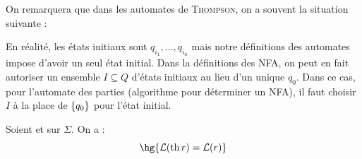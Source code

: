 \documentclass[a4paper,french,bookmarks]{book}
\begin{document}
    On remarquera que dans les automates de \textsc{Thompson}, on a souvent la situation suivante :
    \begin{tikzpicture}
        
    \end{tikzpicture}
    En réalité, les  états initiaux sont $q_{i_1}, \dots, q_{i_n}$ mais notre définitions des automates impose d'avoir un seul état initial. Dans la définitions des NFA, on peut en fait autoriser un ensemble $I \subseteq Q$ d'états initiaux au lieu d'un unique $q_0$. Dans ce cas, pour l'automate des parties (algorithme pour déterminer un NFA), il faut choisir $I$ à la place de $\ens{q_0}$ pour l'état initial.
    
    \begin{theorem}{}{}
        Soient  et  sur $\Sigma$. On a :
        \[ \hg{\bcL\p{\th r} = \bcL\p{r}}\]
    \end{theorem}
    
\end{document}
